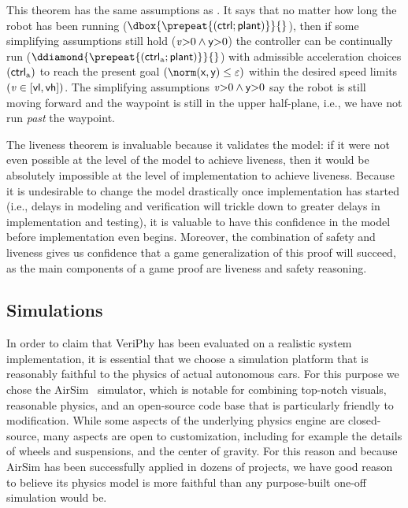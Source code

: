 \documentclass[12pt]{cmuthesis}
\theoremstyle{definition}
\theoremstyle{remark}
\newcommand{\rref}[2][]{\prettyref{#2}}
\newcommand{\VeriPhy}{VeriPhy\xspace}
\begin{document}
This theorem has the same assumptions as \rref{thm:safe}. 
It says that no matter how long the robot has been running ($\dbox{\prepeat{(\ctrl;\plant)}}{}$), 
then if some simplifying assumptions still hold (${\it v}{>}0\land\textsf{y}{>}0$) 
the controller can be continually run ($\ddiamond{\prepeat{(\ctrlliv;\plant)}}{}$) with admissible acceleration choices $(\textsf{ctrl}_{\text{a}})$ to reach the present goal \((\enorm{(\xgvar,\ygvar)} \leq \veps)\) within the desired speed limits \(({\it v} \in [\textsf{vl},\textsf{vh}])\).
The simplifying assumptions ${\it v}{>}0\land\textsf{y}{>}0$ say the robot is still moving forward and the waypoint is still in the upper half-plane, i.e., we have not run \emph{past} the waypoint.

The liveness theorem is invaluable because it validates the \dL model: if it were not even possible at the level of the \dL model to achieve liveness, then it would be absolutely impossible at the level of implementation to achieve liveness.
Because it is undesirable to change the model drastically once implementation has started (i.e., delays in modeling and verification will trickle down to greater delays in implementation and testing), it is valuable to have this confidence in the model before implementation even begins.
Moreover, the combination of safety and liveness gives us confidence that a game generalization of this proof will succeed, as the main components of a game proof are liveness and safety reasoning.

\subsection{Simulations} 
In order to claim that \VeriPhy has been evaluated on a realistic system implementation, it is essential that we choose a simulation platform that is reasonably faithful to the physics of actual autonomous cars.
For this purpose we chose the AirSim~\cite{shah2018airsim} simulator, which is notable for combining top-notch visuals, reasonable physics, and an open-source code base that is particularly friendly to modification.
While some aspects of the underlying physics engine are closed-source, many aspects are open to customization, including for example the details of wheels and suspensions, and the center of gravity.
For this reason and because AirSim has been successfully applied in dozens of projects, we have good reason to believe its physics model is more faithful than any purpose-built one-off simulation would be.
\end{document}
